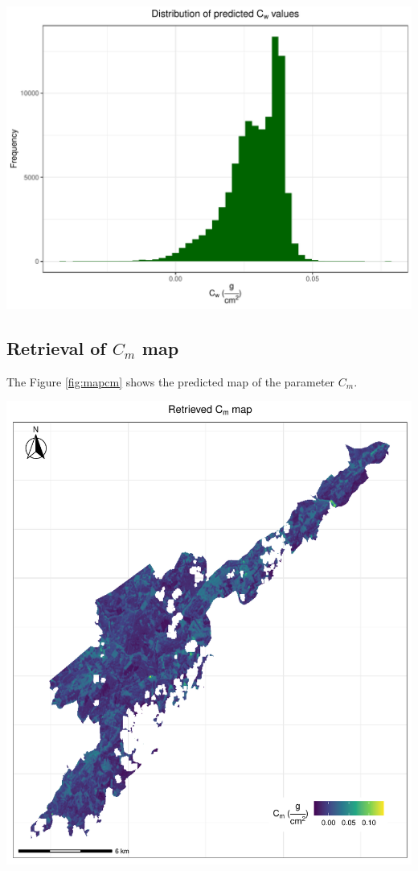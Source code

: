\documentclass[a4paper, twoside]{templates/ociamthesis}
\let\origfigure\figure
\let\endorigfigure\endfigure
\renewenvironment{figure}[1][2] {
    \expandafter\origfigure\expandafter[H]
} {
    \endorigfigure
}
\begin{document}
\begin{figure}
\includegraphics[width=0.8\linewidth]{./figures/cw_hist} \caption{Distribution of the predicted values for the parameter $C_{w}$}\label{fig:histcw}
\end{figure}

\newpage

\hypertarget{retrieval-of-c_m-map}{%
\subsection{\texorpdfstring{Retrieval of \(C_{m}\) map}{Retrieval of C\_\{m\} map}}\label{retrieval-of-c_m-map}}

The Figure \ref{fig:mapcm} shows the predicted map of the parameter \(C_{m}\).

\begin{figure}
\includegraphics[width=0.9\linewidth]{./figures/cm_map} \caption{Predicted map of the parameter $C_{m}$}\label{fig:mapcm}
\end{figure}
\end{document}
